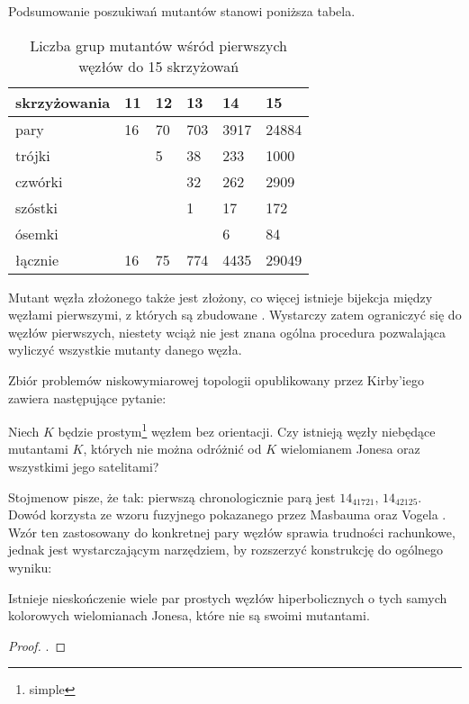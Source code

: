 Podsumowanie poszukiwań mutantów stanowi poniższa tabela.

\begin{table}[h]
\centering
\begin{tabular}{llllll} \toprule
skrzyżowania & 11 & 12 & 13  & 14   & 15    \\ \midrule
pary         & 16 & 70 & 703 & 3917 & 24884 \\
trójki       &    & 5  & 38  & 233  & 1000  \\
czwórki      &    &    & 32  & 262  & 2909  \\
szóstki      &    &    & 1   & 17   & 172   \\
ósemki       &    &    &     & 6    & 84    \\
łącznie      & 16 & 75 & 774 & 4435 & 29049 \\
\bottomrule
\hline
\end{tabular}
\caption{Liczba grup mutantów wśród pierwszych węzłów do 15 skrzyżowań}
\end{table}

Mutant węzła złożonego także jest złożony, co więcej istnieje bijekcja między węzłami pierwszymi, z których są zbudowane \cite{ruberman87}.
Wystarczy zatem ograniczyć się do węzłów pierwszych, niestety wciąż nie jest znana ogólna procedura pozwalająca wyliczyć wszystkie mutanty danego węzła.

Zbiór problemów niskowymiarowej topologii opublikowany przez Kirby'iego zawiera następujące pytanie:
\begin{conjecture}
    Niech $K$ będzie prostym\footnote{simple} węzłem bez orientacji.
    Czy istnieją węzły niebędące mutantami $K$, których nie można odróżnić od $K$ wielomianem Jonesa oraz wszystkimi jego satelitami?
\end{conjecture}

Stojmenow pisze, że tak: pierwszą chronologicznie parą jest $14_{41721}$, $14_{42125}$.
Dowód korzysta ze wzoru fuzyjnego pokazanego przez Masbauma oraz Vogela \cite{masbaum94}.
Wzór ten zastosowany do konkretnej pary węzłów sprawia trudności rachunkowe, jednak jest wystarczającym narzędziem, by rozszerzyć konstrukcję do ogólnego wyniku:

\begin{proposition}
    Istnieje nieskończenie wiele par prostych węzłów hiperbolicznych o tych samych kolorowych wielomianach Jonesa, które nie są swoimi mutantami.
\end{proposition}

\begin{proof}
    \cite{toshifumi09}.
\end{proof}


